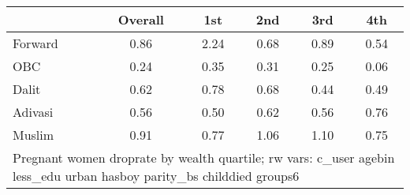\begin{tabular}{l*{5}{c}}
\toprule
            &\multicolumn{1}{c}{Overall}&\multicolumn{1}{c}{1st}&\multicolumn{1}{c}{2nd}&\multicolumn{1}{c}{3rd}&\multicolumn{1}{c}{4th}\\
\midrule
\midrule
Forward     &        0.86&        2.24&        0.68&        0.89&        0.54\\
OBC         &        0.24&        0.35&        0.31&        0.25&        0.06\\
Dalit       &        0.62&        0.78&        0.68&        0.44&        0.49\\
Adivasi     &        0.56&        0.50&        0.62&        0.56&        0.76\\
Muslim      &        0.91&        0.77&        1.06&        1.10&        0.75\\
\bottomrule
\multicolumn{6}{l}{\footnotesize Pregnant women droprate by wealth quartile; rw vars: c\_user agebin less\_edu urban hasboy parity\_bs childdied groups6}\\
\end{tabular}
